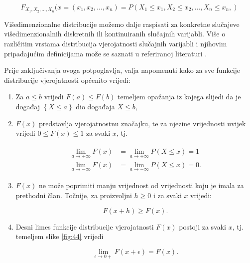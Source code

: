 \documentclass[a4paper,12pt,oneside]{memoir}
\begin{document}
                    \begin{equation}
                        F_{X_1,X_2,\ldots,X_n}(x=(x_1,x_2,\ldots,x_n)=P(X_1\leq x_1,X_2\leq x_2,\ldots,X_n\leq x_n,)
                    \end{equation}

                    Višedimenzionalne distribucije možemo dalje raspisati za konkretne slučajeve višedimenzionalnih diskretnih ili kontinuiranih slučajnih varijabli. Više o različitim vrstama distribucija vjerojatnosti slučajnih varijabli i njihovim pripadajućim definicijama može se saznati u referiranoj literaturi \cite{Bahovec, Dekking}.

                    Prije zaključivanja ovoga potpoglavlja, valja napomenuti kako za sve funkcije distribucije vjerojatnosti općenito vrijedi:

                    \begin{enumerate}
                        \item Za $a\leq b$ vrijedi $F(a)\leq F(b)$ temeljem opažanja iz kojega slijedi da je događaj $\left\{X\leq a\right\}$ dio događaja ${X\leq b}$,
                        \item $F(x)$ predstavlja vjerojatnostnu značajku, te za njezine vrijednosti uvijek vrijedi $0\leq F(x)\leq 1$ za svaki $x$, tj.

                        \begin{align*}
                            \begin{split}
                                \lim\limits_{a\to+\infty}F(x)&=\lim\limits_{a\to+\infty}P(X\leq x)=1\\
                                \lim\limits_{a\to-\infty}F(x)&=\lim\limits_{a\to-\infty}P(X\leq x)=0.
                            \end{split}
                        \end{align*}
                        \item $F(x)$ ne može poprimiti manju vrijednost od vrijednosti koju je imala za prethodni član. Točnije, za proizvoljni $h\geq 0$ i za svaki $x$ vrijedi:
                        
                        \begin{equation}
                            F(x+h)\geq F(x).
                        \end{equation}

                        \item Desni limes funkcije distribucije vjerojatnosti $F(x)$ postoji za svaki $x$, tj. temeljem slike \ref{fig:44} vrijedi
                        
                        \begin{equation}
                            \lim\limits_{\epsilon\to 0+}F(x+\epsilon)=F(x).
                        \end{equation}
                    \end{enumerate}
\end{document}
